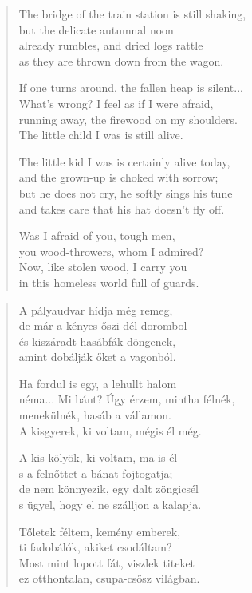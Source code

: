 \documentclass[11pt]{extbook}
\newcommand*{\centeredornament}{\centerline{\pgfornament[width=6cm]{88}}}
\begin{document}
\begin{verse}
  The bridge of the train station is still shaking,\hspace*{-1mm} \\
  but the delicate autumnal noon \\
  already rumbles, and dried logs rattle \\
  as they are thrown down from the wagon.

  If one turns around, the fallen heap is silent...\hspace*{-1mm} \\
  What's wrong? I feel as if I were afraid, \\
  running away, the firewood on my shoulders.\hspace*{-1mm} \\
  The little child I was is still alive.

  The little kid I was is certainly alive today, \\
  and the grown-up is choked with sorrow; \\
  but he does not cry, he softly sings his tune \\
  and takes care that his hat doesn't fly off.

  Was I afraid of you, tough men, \\
  you wood-throwers, whom I admired? \\
  Now, like stolen wood, I carry you \\
  in this homeless world full of guards.
\end{verse}

\newpage

\vspace*{-15mm}
\centeredornament



\begin{verse}
  A pályaudvar hídja még remeg, \\
  de már a kényes őszi dél dorombol \\
  és kiszáradt hasábfák döngenek, \\
  amint dobálják őket a vagonból.

  Ha fordul is egy, a lehullt halom \\
  néma... Mi bánt? Úgy érzem, mintha félnék, \\
  menekülnék, hasáb a vállamon. \\
  A kisgyerek, ki voltam, mégis él még.

  A kis kölyök, ki voltam, ma is él \\
  s a felnőttet a bánat fojtogatja; \\
  de nem könnyezik, egy dalt zöngicsél \\
  s ügyel, hogy el ne szálljon a kalapja.

  Tőletek féltem, kemény emberek, \\
  ti fadobálók, akiket csodáltam? \\
  Most mint lopott fát, viszlek titeket \\
  ez otthontalan, csupa-csősz világban.
\end{verse}
\end{document}
